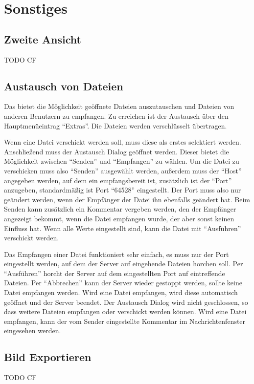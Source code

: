 \chapter{Sonstiges}

\section{Zweite Ansicht}

TODO CF

\section{Austausch von Dateien}

Das \gtitool bietet die Möglichkeit geöffnete Dateien auszutauschen und Dateien
von anderen \gtitool Benutzern zu empfangen. Zu erreichen ist der Austausch über
den Hauptmenüeintrag "`Extras"'. Die Dateien werden verschlüsselt
übertragen.\vspace{10pt}

Wenn eine Datei verschickt werden soll, muss diese als erstes selektiert werden.
Anschließend muss der Austausch Dialog geöffnet werden. Dieser bietet die
Möglichkeit zwischen "`Senden"' und "`Empfangen"' zu wählen. Um die Datei zu
verschicken muss also "`Senden"' ausgewählt werden, außerdem muss der "`Host"'
angegeben werden, auf dem ein \gtitool empfangsbereit ist, zusätzlich ist der
"`Port"' anzugeben, standardmäßig ist Port "`64528"' eingestellt. Der Port muss
also nur geändert werden, wenn der Empfänger der Datei ihn ebenfalls geändert
hat. Beim Senden kann zusätzlich ein Kommentar vergeben werden, den der Empfänger
angezeigt bekommt, wenn die Datei empfangen wurde, der aber sonst keinen
Einfluss hat. Wenn alle Werte eingestellt sind, kann die Datei mit
"`Ausführen"' verschickt werden.\vspace{10pt}

Das Empfangen einer Datei funktioniert sehr einfach, es muss nur der Port
eingestellt werden, auf dem der Server auf eingehende Dateien horchen soll. Per
"`Ausführen"' horcht der Server auf dem eingestellten Port auf eintreffende
Dateien. Per "`Abbrechen"' kann der Server wieder gestoppt werden, sollte keine
Datei empfangen werden. Wird eine Datei empfangen, wird diese automatisch
geöffnet und der Server beendet. Der Austausch Dialog wird nicht geschlossen, so
dass weitere Dateien empfangen oder verschickt werden können. Wird eine Datei
empfangen, kann der vom Sender eingestellte Kommentar im Nachrichtenfenster
eingesehen werden.

\section{Bild Exportieren}

TODO CF